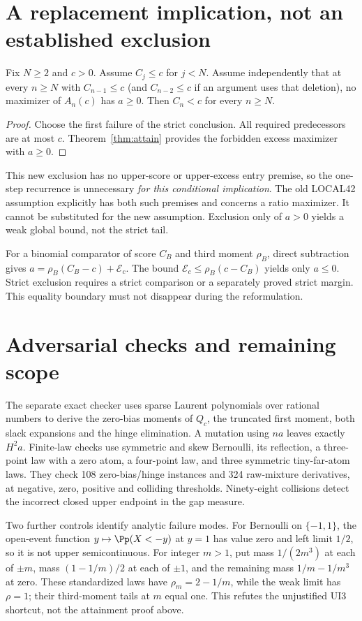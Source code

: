 \section{A replacement implication, not an established exclusion}
\begin{corollary}\label{cor:global}
Fix $N\ge2$ and $c>0$. Assume $C_j\le c$ for $j<N$. Assume independently
that at every $n\ge N$ with $C_{n-1}\le c$ (and $C_{n-2}\le c$ if an
argument uses that deletion), no maximizer of $A_n(c)$ has $a\ge0$.
Then $C_n<c$ for every $n\ge N$.
\end{corollary}
\begin{proof}
Choose the first failure of the strict conclusion. All required
predecessors are at most $c$. Theorem~\ref{thm:attain} provides the
forbidden excess maximizer with $a\ge0$.
\end{proof}
This new exclusion has no upper-score or upper-excess entry premise, so
the one-step recurrence is unnecessary \emph{for this conditional
implication}. The old LOCAL42 assumption explicitly has both such
premises and concerns a ratio maximizer. It cannot be substituted for
the new assumption. Exclusion only of $a>0$ yields a weak global bound,
not the strict tail.

For a binomial comparator of score $C_B$ and third moment $\rho_B$,
direct subtraction gives
$a=\rho_B(C_B-c)+\mathcal E_c$. The bound
$\mathcal E_c\le\rho_B(c-C_B)$ yields only $a\le0$.
Strict exclusion requires a strict comparison or a separately proved
strict margin. This equality boundary must not disappear during the
reformulation.

\section{Adversarial checks and remaining scope}
The separate exact checker uses sparse Laurent polynomials over rational
numbers to derive the zero-bias moments of $Q_c$, the truncated first
moment, both slack expansions and the hinge elimination. A mutation
using $na$ leaves exactly $H^2a$. Finite-law checks use symmetric and
skew Bernoulli, its reflection, a three-point law with a zero atom, a
four-point law, and three symmetric tiny-far-atom laws. They check 108
zero-bias/hinge instances and 324 raw-mixture derivatives, at negative,
zero, positive and colliding thresholds. Ninety-eight collisions detect
the incorrect closed upper endpoint in the gap measure.

Two further controls identify analytic failure modes. For Bernoulli on
$\{-1,1\}$, the open-event function
$y\mapsto\Pp(X<-y)$ at $y=1$ has value zero and left limit $1/2$, so it
is not upper semicontinuous. For integer $m>1$, put mass $1/(2m^3)$ at
each of $\pm m$, mass $(1-1/m)/2$ at each of $\pm1$, and the remaining
mass $1/m-1/m^3$ at zero. These standardized laws have
$\rho_m=2-1/m$, while the weak limit has $\rho=1$; their third-moment
tails at $m$ equal one. This refutes the unjustified UI3 shortcut, not
the attainment proof above.

